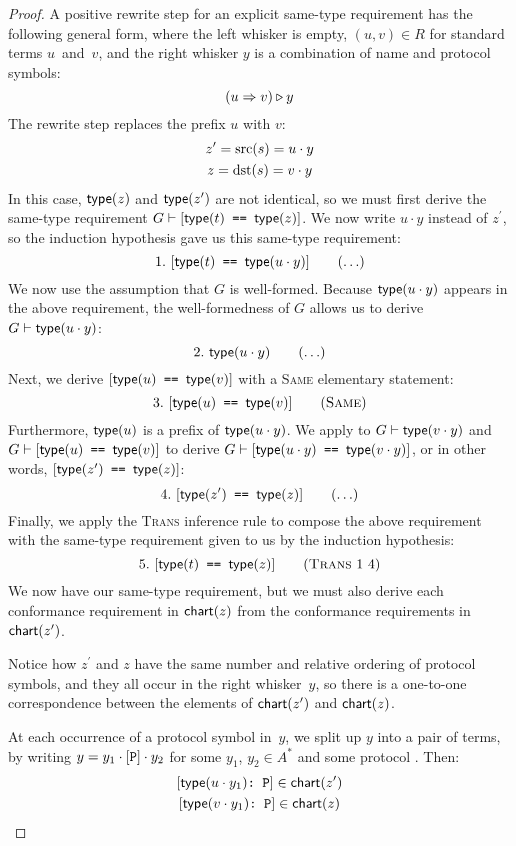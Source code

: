 \documentclass[../generics]{subfiles}
\begin{document}
\begin{proof}
 A positive rewrite step for an explicit same-type requirement has the following general form, where the left whisker is empty, $(u,v)\in R$ for standard terms $u$~and~$v$, and the right whisker $y$ is a combination of name and protocol symbols:
\[(u\Rightarrow v)\triangleright y\]
The rewrite step replaces the prefix $u$ with $v$:
\begin{gather*}
z^\prime=\operatorname{src}(s)=u\cdot y\\
z=\operatorname{dst}(s)=v\cdot y
\end{gather*}
In this case, $\mathsf{type}(z)$ and $\mathsf{type}(z^\prime)$ are not identical, so we must first derive the same-type requirement $G\vdash[\texttt{$\mathsf{type}(t)$ == $\mathsf{type}(z)$}]$. We now write $u\cdot y$ instead of $z^\prime$, so the induction hypothesis gave us this same-type requirement:
\[ \AnyStep{\SameReq{$\Type(t)$}{$\Type(u\cdot y)$}}{1} \]
We now use the assumption that $G$ is well-formed. Because $\mathsf{type}(u\cdot y)$ appears in the above requirement, the well-formedness of $G$ allows us to derive $G\vdash\mathsf{type}(u\cdot y)$:
\[ \AnyStep{\Type(u\cdot y)}{2} \]
Next, we derive $[\texttt{$\mathsf{type}(u)$ == $\mathsf{type}(v)$}]$ with a \textsc{Same} elementary statement:
\[ \SameStep{$\Type(u)$}{$\Type(v)$}{3} \]
Furthermore, $\mathsf{type}(u)$ is a prefix of $\mathsf{type}(u\cdot y)$. We apply  to $G\vdash\texttt{$\mathsf{type}(v\cdot y)$}$ and $G\vdash[\texttt{$\mathsf{type}(u)$ == $\mathsf{type}(v)$}]$ to derive $G\vdash[\texttt{$\mathsf{type}(u\cdot y)$ == $\mathsf{type}(v\cdot y)$}]$, or in other words, $[\texttt{$\mathsf{type}(z^\prime)$ == $\mathsf{type}(z)$}]$:
\[
\AnyStep{\SameReq{$\Type(z^\prime)$}{$\Type(z)$}}{4}
\]
Finally, we apply the \textsc{Trans} inference rule to compose the above requirement with the same-type requirement given to us by the induction hypothesis:
\[
\TransStep{1}{4}{$\Type(t)$}{$\Type(z)$}{5}
\]
We now have our same-type requirement, but we must also derive each conformance requirement in $\mathsf{chart}(z)$ from the conformance requirements in $\mathsf{chart}(z^\prime)$.

Notice how $z^\prime$ and $z$ have the same number and relative ordering of protocol symbols, and they all occur in the right whisker~$y$, so there is a one-to-one correspondence between the elements of $\mathsf{chart}(z^\prime)$ and $\mathsf{chart}(z)$.

At each occurrence of a protocol symbol in~$y$, we split up $y$ into a pair of terms, by writing $y=y_1\cdot[\texttt{P}]\cdot y_2$ for some $y_1$, $y_2\in A^*$ and some protocol \tP. Then:
\begin{gather*}
\ConfReq{$\Type(u\cdot y_1)$}{P}\in\Chart(z^\prime)\\
\ConfReq{$\Type(v\cdot y_1)$}{P}\in\Chart(z)
\end{gather*}


\end{proof}
\end{document}
